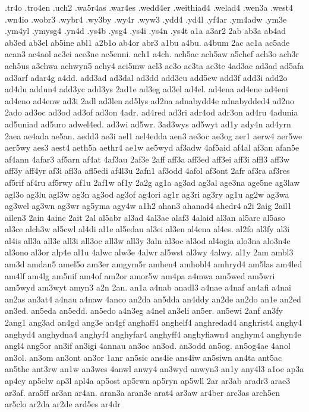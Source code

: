 {.tr4o
.tro4en
.uch2
.wa5r4as
.war4es
.wedd4er
.weithiad4
.welad4
.wen3a
.west4
.wn4io
.wobr3
.wybr4
.wy3by
.wy4r
.wyw3
.ydd4
.yd4l
.yf4ar
.ym4adw
.ym3e
.ym4yl
.ymysg4
.yn4d
.ys4b
.ysg4
.ys4i
.ys4n
.ys4t
a1a
a3ar2
2ab
ab3a
ab4ad
ab3ed
ab3el
ab5ine
abl1
a2b1o
ab4or
abr3
a1bu
a4bu.
a4bum
2ac
ac1a
ac5ade
acan3
ac4aol
ac3ei
ace3ne
ac5enni.
ach1
a4ch.
ach5ac
ach5aw
a5chef
ach3o
ach3r
ach5us
a3chwa
achwyn5
achy4
aci5mw
acl3
ac3o
ac3ta
ac3te
4ad3ac
ad3ad
ad5afa
ad3arf
adar4g
a4dd.
add3ad
ad3dal
ad3dd
add3eu
add5ew
add3f
add3i
add2o
ad4du
addun4
add3yc
add3ys
2ad1e
ad3eg
ad3el
ad4el.
ad4ena
ad4ene
ad4eni
ad4eno
ad4enw
ad3i
2adl
ad3len
ad5lys
ad2na
adnabydd4e
adnabydded4
ad2no
2ado
ad3oc
ad3od
ad3of
ad3on
4adr.
ad4red
ad3ri
adr4od
adr3on
ad4ru
4adunia
ad5uniad
ad5uro
adwel4ed.
ad3wi
ad5wr.
3ad3wys
ad5wyt
ad1y
ady4n
ad4yrn
2aea
ae4ada
ae5an.
aedd3
ae3i
ael1
ael4edda
aen3
ae3oc
ae3og
aer1
aerw4
aer5we
aer5wy
aes3
aest4
aeth5a
aethr4
ae1w
ae5wyd
af3adw
4af5aid
af4al
af3an
afan5e
af4ann
4afar3
af5arn
af4at
4af3au
2af3e
2aff
aff3a
aff3ed
aff3ei
aff3i
affl3
aff3w
aff3y
aff4yr
af3i
afl3a
afl5edi
af4l3u
2afn1
af3odd
4afol
af3ont
2afr
af3ra
af3res
af5rif
af4ru
af5rwy
af1u
2af1w
af1y
2a2g
ag1a
ag3ad
ag3al
age3na
age5ne
ag3law
agl3o
ag3lu
agl3w
ag3n
ag3od
ag3of
ag4ori
ag1r
ag3ri
ag3ry
ag1u
ag2w
ag3wa
ag3wel
ag3wn
ag3wr
ag5yma
agy4w
a1h2
ahan3
ahanad4
ahedr4
a2i
2aig
2ail1
ailen3
2ain
4ainc
2ait
2al
al5abr
al3ad
4al3ae
alaf3
4alaid
al3an
al5arc
al5aso
al3ce
alch3w
al5cwl
al4di
al1e
al5edau
al3ei
al3en
al4ena
al4es.
al2fo
al3fy
al3i
al4is
all3a
all3e
all3i
all3oc
all3w
all3y
3aln
al3oc
al3od
al4ogia
alo3na
alo3n4e
al3ono
al3or
alp4e
al1u
4alwc
alw3e
4alwr
al5wst
al3wy
4alwy.
al1y
2am
ambl3
am3d
amdan5
amel5o
am3er
amgym5r
amhen4
amhobl4
amhryd4
am5las
am4led
am4lf
am4lg
am5nif
am4of
am2or
amor5w
am4pa
a4mwa
am5wed
am5wri
am5wyd
am3wyt
amyn3
a2n
2an.
an1a
a4nab
anadl3
a4nae
a4naf
an4afi
a4nai
an2as
an3at4
a4nau
a4naw
4anco
an2da
an5dda
an4ddy
an2de
an2do
an1e
an2ed
an3ed.
an5eda
an5edd.
an5edo
a4n3eg
a4nel
an3eli
an5er.
an5ewi
2anf
an3fy
2ang1
ang3ad
an4gd
ang3e
an4gf
anghaff4
anghelf4
anghredad4
anghrist4
anghy4
anghyd4
anghydna4
anghyf4
anghyfar4
anghyff4
anghyfiawn4
anghym4
anghyn4e
angl4
ang5or
an3if
an3igi
4annau
an3oc
an3od.
an3odd
an5og.
an5og4ae
4anol
an3ol.
an3om
an3ont
an3or
1anr
an5sic
ans4ie
ans4iw
an5siwn
an4ta
ant5ac
an5the
ant3rw
an1w
an3wes
4anwl
anwy4
an3wyd
anwyn3
an1y
any4l3
a1oe
ap3a
ap4cy
ap5elw
ap3l
apl4a
ap5ost
ap5rwn
ap5ryn
ap5wll
2ar
ar3ab
aradr3
arae3
ar3af.
ara5ff
ar3an
ar4an.
aran3a
aran3e
arat4
ar3aw
ar4ber
arc3as
arch5en
ar5clo
ar2da
ar2de
ard5es
ar4dr
}
